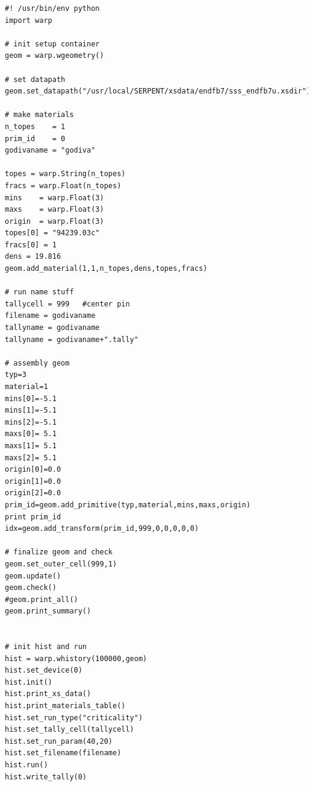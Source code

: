 \documentclass[twoside,a4paper]{refart}
\begin{document}
\begin{verbatim}
#! /usr/bin/env python
import warp

# init setup container
geom = warp.wgeometry()

# set datapath
geom.set_datapath("/usr/local/SERPENT/xsdata/endfb7/sss_endfb7u.xsdir")

# make materials
n_topes    = 1
prim_id    = 0
godivaname = "godiva"

topes = warp.String(n_topes)
fracs = warp.Float(n_topes)
mins    = warp.Float(3)
maxs    = warp.Float(3)
origin  = warp.Float(3)
topes[0] = "94239.03c"
fracs[0] = 1
dens = 19.816
geom.add_material(1,1,n_topes,dens,topes,fracs)

# run name stuff
tallycell = 999   #center pin
filename = godivaname
tallyname = godivaname
tallyname = godivaname+".tally"

# assembly geom
typ=3
material=1
mins[0]=-5.1
mins[1]=-5.1
mins[2]=-5.1
maxs[0]= 5.1
maxs[1]= 5.1
maxs[2]= 5.1
origin[0]=0.0
origin[1]=0.0
origin[2]=0.0
prim_id=geom.add_primitive(typ,material,mins,maxs,origin)
print prim_id
idx=geom.add_transform(prim_id,999,0,0,0,0,0)

# finalize geom and check
geom.set_outer_cell(999,1)
geom.update()
geom.check()
#geom.print_all()
geom.print_summary()


# init hist and run
hist = warp.whistory(100000,geom)
hist.set_device(0)
hist.init()
hist.print_xs_data()
hist.print_materials_table()
hist.set_run_type("criticality")
hist.set_tally_cell(tallycell)
hist.set_run_param(40,20)
hist.set_filename(filename)
hist.run()
hist.write_tally(0)
\end{verbatim}
\end{document}
